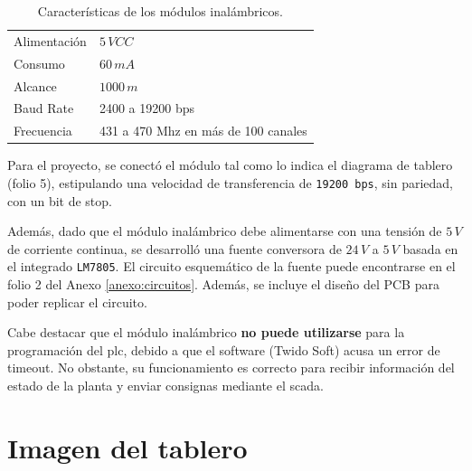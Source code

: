 \begin{table}[ht]
\renewcommand{\arraystretch}{1.3}
\centering
\begin{tabular}{|l|l|}
\hline
Alimentación & $5\,VCC$\\
Consumo& $60\,mA$\\
Alcance& $1000\,m$\\
Baud Rate &2400 a 19200 bps \\
Frecuencia& 431 a 470 Mhz en más de 100 canales\\
\hline
\end{tabular}
\caption{Características de los módulos inalámbricos.}
\label{tab:caractMod}
\end{table}

Para el proyecto, se conectó el módulo tal como lo indica el
diagrama de tablero (folio 5), estipulando una velocidad de transferencia de
\verb|19200 bps|, sin pariedad, con un bit de stop.

Además, dado que el módulo inalámbrico debe alimentarse con una tensión de
$5\,V$ de corriente continua, se desarrolló una fuente conversora de $24\,V$ a
$5\,V$ basada en el integrado \verb|LM7805|.
El circuito esquemático de la fuente puede encontrarse en el folio 2 del Anexo
\ref{anexo:circuitos}.
Además, se incluye el diseño del PCB para poder replicar el circuito.

Cabe destacar que el módulo inalámbrico \textbf{no puede utilizarse} para
la programación del \gls{plc}, debido a que el software (Twido Soft) acusa un
error de timeout.
No obstante, su funcionamiento es correcto para recibir información
del estado de la planta y enviar consignas mediante el \gls{scada}.

\section{Imagen del tablero}

